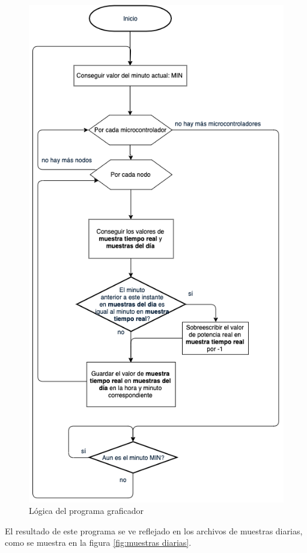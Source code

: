 \begin{figure}[H]
	\centering
	\includegraphics[scale=.5]{Capitulo5/images/logica_graficador.png}
	\caption{Lógica del programa graficador}
	\label{fig:programa graficador}
\end{figure} 

El resultado de este programa se ve reflejado en los archivos de muestras diarias, como se muestra en la figura \ref{fig:muestras diarias}.

